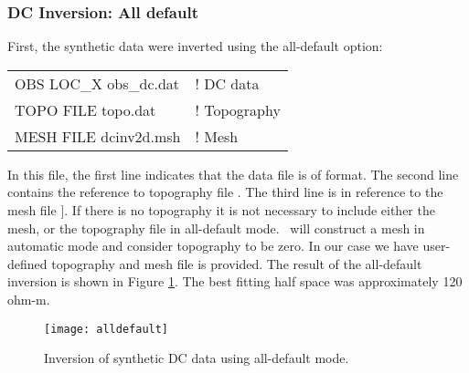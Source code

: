 \subsubsection{DC Inversion: All default}
First, the synthetic data were inverted using the all-default option:
%
\begin{fileExample}
\begin{tabular}{|ll|}
\hline
OBS LOC\_X obs\_dc.dat & ! DC data \\
TOPO FILE topo.dat & ! Topography\\
MESH FILE dcinv2d.msh & ! Mesh\\
\hline
\end{tabular}
\end{fileExample}
%
In this file, the first line indicates that the data file  is of  format. The second line contains the reference to topography file . The third line is in reference to the mesh file ]. If there is no topography it is not necessary to include either the mesh, or the topography file in all-default mode. \prog~will construct a mesh in automatic mode and consider topography to be zero. In our case we have user-defined topography and mesh file is provided. The result of the all-default inversion is shown in Figure \ref{fig:alldefault}. The best fitting half space was approximately 120 ohm-m.
%
\begin{figure}
\centering
\texttt{[image: alldefault]}
\caption{Inversion of synthetic DC data using all-default mode.}
\label{fig:alldefault}
\end{figure}

